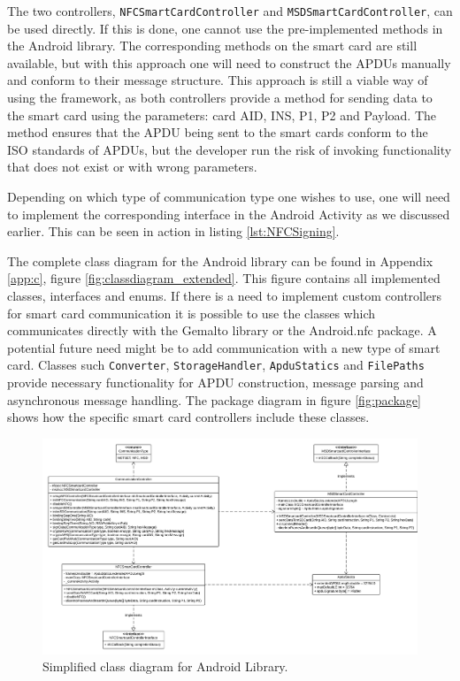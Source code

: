 The two controllers, \texttt{NFCSmartCardController} and \texttt{MSDSmartCardController}, can be used directly. If this is done, one cannot use the pre-implemented methods in the Android library. The corresponding methods on the smart card are still available, but with this approach one will need to construct the APDUs manually and conform to their message structure. This approach is still a viable way of using the framework, as both controllers provide a method for sending data to the smart card using the parameters: card AID, INS, P1, P2 and Payload. The method ensures that the APDU being sent to the smart cards conform to the ISO standards of APDUs, but the developer run the risk of invoking functionality that does not exist or with wrong parameters.

Depending on which type of communication type one wishes to use, one will need to implement the corresponding interface in the Android Activity as we discussed earlier. This can be seen in action in listing \ref{lst:NFCSigning}.

The complete class diagram for the Android library can be found in Appendix \ref{app:c}, figure \ref{fig:classdiagram_extended}. This figure contains all implemented classes, interfaces and enums. If there is a need to implement custom controllers for smart card communication it is possible to use the classes which communicates directly with the Gemalto library or the Android.nfc package. A potential future need might be to add communication with a new type of smart card. Classes such \texttt{Converter}, \texttt{StorageHandler}, \texttt{ApduStatics} and \texttt{FilePaths} provide necessary functionality for APDU construction, message parsing and asynchronous message handling. The package diagram in figure \ref{fig:package} shows how the specific smart card controllers include these classes. %

\begin{figure}[h!]
  \caption{Simplified class diagram for Android Library.}
  \label{fig:classdiagram_simple}
  \centering
    \includegraphics[width=1.25\textwidth, angle =90]{images/Class_Diagram.png}
\end{figure}

